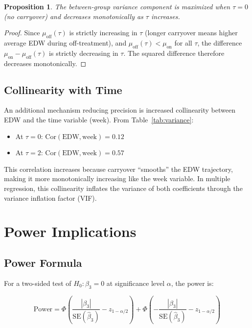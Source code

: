 \documentclass[11pt,letterpaper]{article}
\newtheorem{proposition}{Proposition}
\begin{document}
\begin{proposition}
The between-group variance component is maximized when $\tau = 0$ (no
carryover) and decreases monotonically as $\tau$ increases.
\end{proposition}

\begin{proof}
Since $\mu_{\text{off}}(\tau)$ is strictly increasing in $\tau$ (longer
carryover means higher average EDW during off-treatment), and
$\mu_{\text{off}}(\tau) < \mu_{\text{on}}$ for all $\tau$, the difference
$\mu_{\text{on}} - \mu_{\text{off}}(\tau)$ is strictly decreasing in $\tau$.
The squared difference therefore decreases monotonically.
\end{proof}

\subsection{Collinearity with Time}

An additional mechanism reducing precision is increased collinearity between
EDW and the time variable (week). From Table~\ref{tab:variance}:

\begin{itemize}
    \item At $\tau = 0$: $\text{Cor}(\text{EDW}, \text{week}) = 0.12$
    \item At $\tau = 2$: $\text{Cor}(\text{EDW}, \text{week}) = 0.57$
\end{itemize}

This correlation increases because carryover ``smooths'' the EDW trajectory,
making it more monotonically increasing like the week variable. In multiple
regression, this collinearity inflates the variance of both coefficients
through the variance inflation factor (VIF).

\section{Power Implications}

\subsection{Power Formula}

For a two-sided test of $H_0: \beta_3 = 0$ at significance level $\alpha$,
the power is:

\begin{equation}
\text{Power} = \Phi\left(\frac{|\beta_3|}{\text{SE}(\hat{\beta}_3)} -
z_{1-\alpha/2}\right) + \Phi\left(-\frac{|\beta_3|}{\text{SE}(\hat{\beta}_3)}
- z_{1-\alpha/2}\right)
\label{eq:power}
\end{equation}
\end{document}
